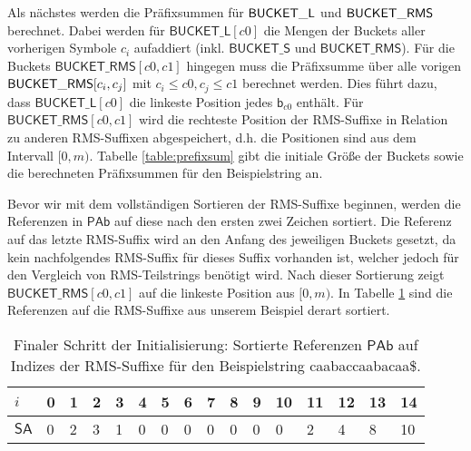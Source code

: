Als nächstes werden die Präfixsummen für $\mathsf{BUCK\-ET\_L}$ und $\mathsf{BUCK\-ET\_RMS}$ berechnet. Dabei werden für $\mathsf{BUCKET\_L}[c0]$ die Mengen der Buckets aller vorherigen Symbole $c_i$ aufaddiert (inkl. $\mathsf{BUCKET\_S}$ und $\mathsf{BUCKET\_RMS}$). Für die Buckets $\mathsf{BUCKET\_RMS}[c0,c1]$ hingegen muss die Präfixsumme über alle vorigen $\mathsf{BUCK\-ET\_RMS}[c_i,c_j]$  mit $c_i \leq c0, c_j \leq c1$ berechnet werden. Dies führt dazu, dass $\mathsf{BUCKET\_L}[c0]$ die linkeste Position jedes $\mathsf{b}_{c0}$ enthält. Für $\mathsf{BUCKET\_RMS}[c0,c1]$ wird die rechteste Position der RMS-Suffixe in Relation zu anderen RMS-Suffixen abgespeichert, d.h. die Positionen sind aus dem Intervall $[0,m)$. Tabelle \ref{table:prefixsum} gibt die initiale Größe der Buckets sowie die berechneten Präfixsummen für den Beispielstring an.

Bevor wir mit dem vollständigen Sortieren der RMS-Suffixe beginnen, werden die Referenzen in $\mathsf{PAb}$ auf diese nach den ersten zwei Zeichen sortiert. Die Referenz auf das letzte RMS-Suffix wird an den Anfang des jeweiligen Buckets gesetzt, da kein nachfolgendes RMS-Suffix für dieses Suffix vorhanden ist, welcher jedoch für den Vergleich von RMS-Teilstrings benötigt wird. Nach dieser Sortierung zeigt $\mathsf{BUCKET\_RMS}[c0,c1]$ auf die linkeste Position aus $[0,m)$. In Tabelle \ref{table:bucket-order} sind die Referenzen auf die RMS-Suffixe aus unserem Beispiel derart sortiert.

\begin{table}
	\centering
	\begin{tabular}[t]{l|lllllllllllllll}
		$i$  & 0                         & 1                         & 2                         & 3                         & 4 & 5 & 6 & 7 & 8 & 9 & 10 & 11 & 12 & 13 & 14 \\ \hline
		$\mathsf{SA}$ & \cellcolor[HTML]{32CB00}0 & \cellcolor[HTML]{32CB00}2 & \cellcolor[HTML]{32CB00}3 & \cellcolor[HTML]{32CB00}1 & 0 & 0 & 0 & 0 & 0 & 0 & 0  & 2  & 4  & 8  & 10 \\ \hline
	\end{tabular}	\newline

	\caption{Finaler Schritt der Initialisierung: Sortierte Referenzen $\mathsf{PAb}$ auf Indizes der RMS-Suffixe für den Beispielstring caabaccaabacaa\$.}
	\label{table:bucket-order}
\end{table}

